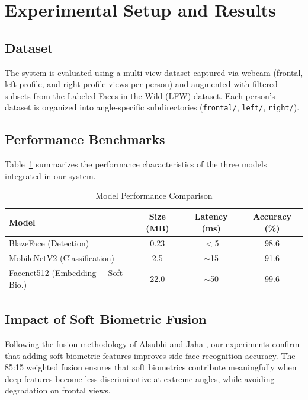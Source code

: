 \documentclass[conference]{IEEEtran}
\begin{document}
\section{Experimental Setup and Results}

\subsection{Dataset}

The system is evaluated using a multi-view dataset captured via webcam (frontal, left profile, and right profile views per person) and augmented with filtered subsets from the Labeled Faces in the Wild (LFW) dataset. Each person's dataset is organized into angle-specific subdirectories (\texttt{frontal/}, \texttt{left/}, \texttt{right/}).

\subsection{Performance Benchmarks}

Table~\ref{tab:benchmark} summarizes the performance characteristics of the three models integrated in our system.

\begin{table}[htbp]
\caption{Model Performance Comparison}
\begin{center}
\begin{tabular}{lccc}
\toprule
\textbf{Model} & \textbf{Size (MB)} & \textbf{Latency (ms)} & \textbf{Accuracy (\%)} \\
\midrule
BlazeFace (Detection) & 0.23 & $<$5 & 98.6 \\
MobileNetV2 (Classification) & 2.5 & $\sim$15 & 91.6 \\
Facenet512 (Embedding + Soft Bio.) & 22.0 & $\sim$50 & 99.6 \\
\bottomrule
\end{tabular}
\label{tab:benchmark}
\end{center}
\end{table}

\subsection{Impact of Soft Biometric Fusion}

Following the fusion methodology of Alsubhi and Jaha \cite{b4}, our experiments confirm that adding soft biometric features improves side face recognition accuracy. The 85:15 weighted fusion ensures that soft biometrics contribute meaningfully when deep features become less discriminative at extreme angles, while avoiding degradation on frontal views.
\end{document}
